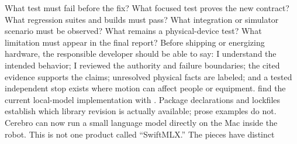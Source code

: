 {}\markdownRendererUlBegin
\markdownRendererUlItem What test must fail before the fix?\markdownRendererUlItemEnd 
\markdownRendererUlItem What focused test proves the new contract?\markdownRendererUlItemEnd 
\markdownRendererUlItem What regression suites and builds must pass?\markdownRendererUlItemEnd 
\markdownRendererUlItem What integration or simulator scenario must be observed?\markdownRendererUlItemEnd 
\markdownRendererUlItem What remains a physical-device test?\markdownRendererUlItemEnd 
\markdownRendererUlItem What limitation must appear in the final report?\markdownRendererUlItemEnd 
\markdownRendererUlEnd \markdownRendererInterblockSeparator
{}
\markdownRendererSectionEnd \markdownRendererSectionBegin
{}\markdownRendererInterblockSeparator
{}\markdownRendererInterblockSeparator
{}
\markdownRendererSectionEnd \markdownRendererSectionBegin
{}\markdownRendererInterblockSeparator
{}Before shipping or energizing hardware, the responsible developer should be\markdownRendererSoftLineBreak
{}able to say: I understand the intended behavior; I reviewed the authority and\markdownRendererSoftLineBreak
{}failure boundaries; the cited evidence supports the claims; unresolved\markdownRendererSoftLineBreak
{}physical facts are labeled; and a tested independent stop exists where motion\markdownRendererSoftLineBreak
{}can affect people or equipment.\markdownRendererInterblockSeparator
{}\markdownRendererThematicBreak{}\markdownRendererInterblockSeparator
{}
\markdownRendererSectionEnd 
\markdownRendererSectionEnd \markdownRendererSectionBegin
{}\markdownRendererInterblockSeparator
{}\markdownRendererBlockQuoteBegin
{} find the current local-model implementation with . Package declarations and lockfiles establish which library revision is actually available; prose examples do not.\markdownRendererBlockQuoteEnd \markdownRendererInterblockSeparator
{}Cerebro can now run a small language model directly on the Mac inside the\markdownRendererSoftLineBreak
{}robot. This is not one product called “SwiftMLX.” The pieces have distinct\markdownRendererSoftLineBreak

